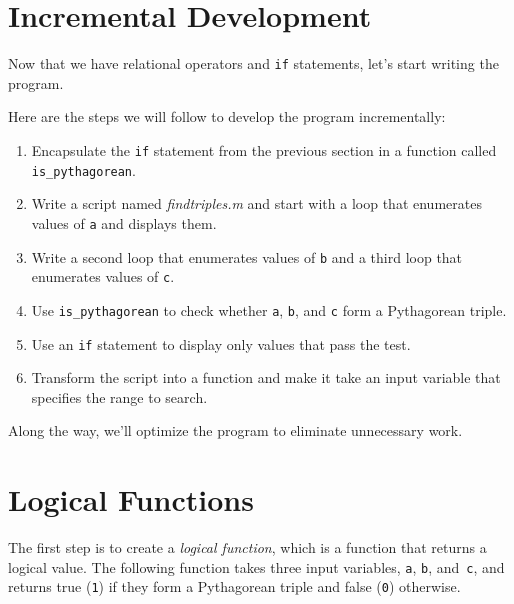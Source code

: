 \section{Incremental Development}
\label{increxample}

Now that we have relational operators and \lstinline{if} statements, let's start writing
the program.

Here are the steps we will follow to develop the program incrementally:

\begin{enumerate}

\item Encapsulate the \lstinline{if} statement from the previous section in a function called \lstinline{is_pythagorean}.

\item Write a script named \emph{find\textunderscore triples.m} and start with a loop that enumerates values of \lstinline{a} and displays them.

\item Write a second loop that enumerates values of \lstinline{b} and a third loop that enumerates values of \lstinline{c}.

\item Use \lstinline{is_pythagorean} to check whether \lstinline{a}, \lstinline{b}, and \lstinline{c} form a Pythagorean triple.

\item Use an \lstinline{if} statement to display only values that pass the test.

\item Transform the script into a function and make it take an input variable that specifies the range to search.

\end{enumerate}

Along the way, we'll optimize the program to eliminate unnecessary work.


\section{Logical Functions}

The first step is to create a \emph{logical function}, which is a function that returns a logical value.
The following function takes three input variables, \lstinline{a}, \lstinline{b}, and~\lstinline{c}, and returns true (\lstinline{1}) if they form a Pythagorean triple and false (\lstinline{0}) otherwise.

